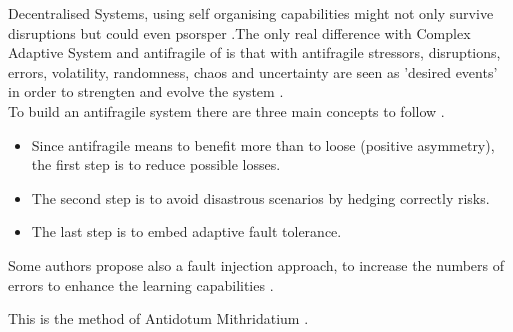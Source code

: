 Decentralised Systems, using self organising capabilities might not only survive disruptions but could even psorsper \parencite{Brafman2007}.The only real difference with Complex Adaptive System and antifragile of \textcite{Taleb2012} is that with antifragile stressors, disruptions, errors, volatility, randomness, chaos and uncertainty are seen as 'desired events' in order to strengten and evolve the system \parencite{Jaaron2014}.\\

To build an antifragile system there are three main concepts to follow \parencite{Russo2017}.
\begin{itemize}
	\item{Since antifragile means to benefit more than to loose (positive asymmetry), the first step is to reduce possible losses.}
	\item{The second step is to avoid disastrous scenarios by hedging correctly risks.}
	\item{The last step is to embed adaptive fault tolerance.}
\end{itemize}

Some authors propose also a fault injection approach, to increase the numbers of errors to enhance the
learning capabilities \parencite{Russo2017}.
\begin{remark}
	This is the method of Antidotum Mithridatium \parencite{Taleb2012}.
\end{remark}

